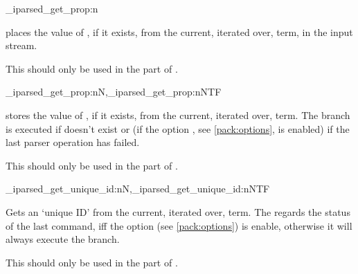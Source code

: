 \documentclass[10pt]{article}
\begin{document}
\begin{codedescribe}[code,EXP,new=2026/02/01]{\starray_iparsed_get_prop:n}
\begin{codesyntax}%
\end{codesyntax}
 places the value of , if it exists, from the current, iterated over, term, in the input stream. 
\end{codedescribe}
\begin{tsremark}
This should only be used in the  part of .
\end{tsremark}

\begin{codedescribe}[code,new=2026/02/01]{\starray_iparsed_get_prop:nN,\starray_iparsed_get_prop:nNTF}
\begin{codesyntax}%
\end{codesyntax}
 stores the value of , if it exists, from the current, iterated over, term. The  branch is executed if  doesn't exist or (if the option , see \ref{pack:options},  is enabled) if the last parser operation has failed.
\end{codedescribe}
\begin{tsremark}
This should only be used in the  part of .
\end{tsremark}

\begin{codedescribe}[code,new=2026/02/01]{\starray_iparsed_get_unique_id:nN,\starray_iparsed_get_unique_id:nNTF}
\begin{codesyntax}%
\end{codesyntax}
Gets an `unique ID' from the current, iterated over, term. The  regards the status of the last  command, iff the option  (see \ref{pack:options}) is enable, otherwise it will always execute the  branch.
\end{codedescribe}
\begin{tsremark}
This should only be used in the  part of .
\end{tsremark}
\end{document}
